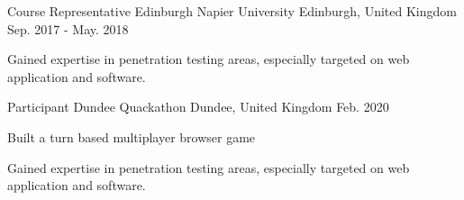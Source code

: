 

\begin{cventries}

  \cventry
    {Course Representative} %
    {Edinburgh Napier University} %
    {Edinburgh, United Kingdom} %
    {Sep. 2017 - May. 2018} %
    {
      \begin{cvitems} %
        \item {Gained expertise in penetration testing areas, especially targeted on web application and software.}
      \end{cvitems}
    }

  \cventry
    {Participant} %
    {Dundee Quackathon} %
    {Dundee, United Kingdom} %
    {Feb. 2020} %
    {
      \begin{cvitems} %
        \item {Built a turn based multiplayer browser game }
        \item {Gained expertise in penetration testing areas, especially targeted on web application and software.}
      \end{cvitems}
    }

\end{cventries}
